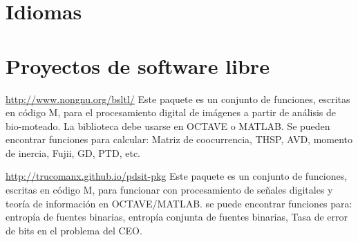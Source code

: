 \documentclass[11pt,a4paper,sans]{moderncv} %
\begin{document}





\section{Idiomas}


 
\section{Proyectos de software libre}

			{\url{http://www.nongnu.org/bsltl/}}
			{}{}
			{Este paquete es un conjunto de funciones, escritas en código M, para el
 procesamiento digital de imágenes a partir de análisis de bio-moteado.
 La biblioteca debe usarse en OCTAVE o MATLAB.
 Se pueden encontrar funciones para calcular:
 Matriz de coocurrencia, THSP, AVD, momento de inercia,
 Fujii, GD, PTD, etc.}

			{\url{http://trucomanx.github.io/pdsit-pkg}}
			{}{}
			{Este paquete es un conjunto de funciones, escritas en código M, para funcionar
 con procesamiento de señales digitales y teoría de
 información en OCTAVE/MATLAB. se puede encontrar
 funciones para: entropía de fuentes binarias,
 entropía conjunta de fuentes binarias,
 Tasa de error de bits en el problema del CEO. }
			
\end{document}
